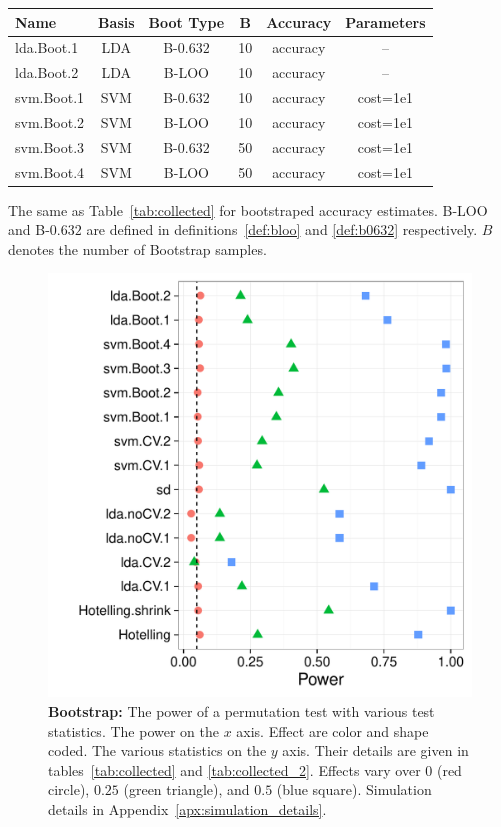 \documentclass[12pt,a4paper]{article}
\theoremstyle{definition}
\begin{document}
\bigskip

\begin{tcolorbox}
\centering
\begin{tabular}{l|c|c|c|c|c}
Name & Basis & Boot Type & B & Accuracy & Parameters\\ 
\hline
\hline
lda.Boot.1 & LDA & B-$0.632$ 	& 10 & accuracy &  -- \\ 
lda.Boot.2 & LDA & B-LOO 	& 10 & accuracy &  -- \\ 
svm.Boot.1 & SVM & B-$0.632$ 	& 10 & accuracy & cost=1e1 \\ 
svm.Boot.2 & SVM & B-LOO 	& 10 & accuracy & cost=1e1 \\ 
svm.Boot.3 & SVM & B-$0.632$ 	& 50 & accuracy & cost=1e1 \\ 
svm.Boot.4 & SVM & B-LOO 	& 50 & accuracy & cost=1e1 \\ 
\end{tabular} 
\captionsetup{type=table}
\caption{The same as Table~\ref{tab:collected} for bootstraped accuracy estimates. 
B-LOO and B-$0.632$ are defined in definitions~\ref{def:bloo} and \ref{def:b0632} respectively.
$B$ denotes the number of Bootstrap samples. } %
\label{tab:collected_2}
\end{tcolorbox}


\begin{figure}[ht]
\centering
	  \includegraphics[width=0.8\linewidth]{"art/2016-08-09 20:09:20"}
	  \caption{
		  \textbf{Bootstrap:}
		  The power of a permutation test with various test statistics. 
		  The power on the $x$ axis. 
		  Effect are color and shape coded. 
		  The various statistics on the $y$ axis. 
		  Their details are given in tables~\ref{tab:collected} and \ref{tab:collected_2}. 
		  Effects vary over $0$ (red circle), $0.25$ (green triangle), and $0.5$ (blue square). 
		  Simulation details in Appendix~\ref{apx:simulation_details}.
		  } 
	\label{fig:bootstrap}
\end{figure}
\end{document}

